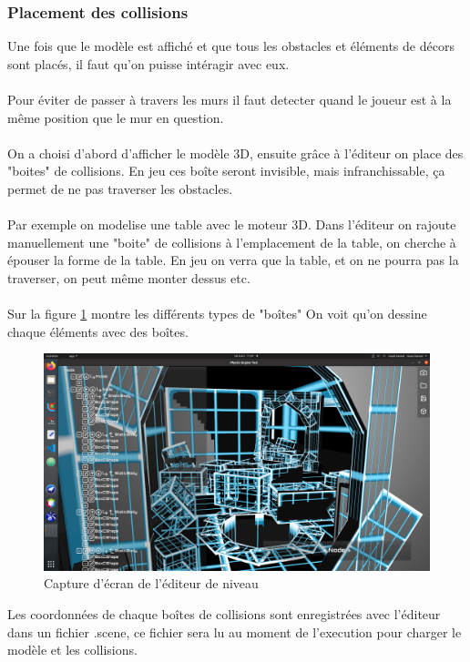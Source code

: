 \subsubsection{Placement des collisions}
Une fois que le modèle est affiché et que tous les obstacles et éléments de
décors sont placés, il faut qu'on puisse intéragir avec eux.
\\ \\
Pour éviter de passer à travers les murs il faut detecter quand le joueur
est à la même position que le mur en question.
\\ \\
On a choisi d'abord d'afficher le modèle 3D, ensuite grâce à l'éditeur on
place des "boites" de collisions. En jeu ces boîte seront invisible, mais
infranchissable, ça permet de ne pas traverser les obstacles.
\\ \\
Par exemple on modelise une table avec le moteur 3D. Dans l'éditeur on rajoute
manuellement une "boite" de collisions à l'emplacement de la table, on cherche
à épouser la forme de la table. En jeu on verra que la table, et on ne pourra
pas la traverser, on peut même monter dessus etc.
\\ \\
Sur la figure \ref{fig:fig2} montre les différents types de "boîtes" On voit qu'on dessine
chaque éléments avec des boîtes.



\begin{figure}[H]
    \centering
    \includegraphics[width=1\linewidth]{images/screenshot_editeur.png}
    \caption{Capture d'écran de l'éditeur de niveau}
    \label{fig:fig2}
\end{figure}

Les coordonnées de chaque boîtes de collisions sont enregistrées avec l'éditeur
dans un fichier .scene, ce fichier sera lu au moment de l'execution pour
charger le modèle et les collisions.



\newpage